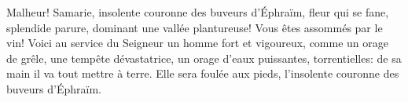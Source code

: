 Malheur! Samarie, insolente couronne des buveurs d’Éphraïm,
	fleur qui se fane, splendide parure, dominant une vallée plantureuse!
	Vous êtes assommés par le vin!
Voici au service du Seigneur un homme fort et vigoureux,
	comme un orage de grêle, une tempête dévastatrice,
	un orage d’eaux puissantes, torrentielles:
	de sa main il va tout mettre à terre.
Elle sera foulée aux pieds,
	l’insolente couronne des buveurs d’Éphraïm.
